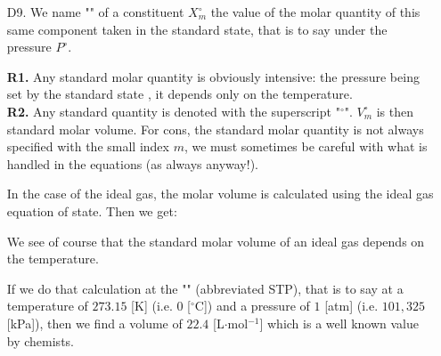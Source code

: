 \begin{enumerate}
		
		\item[D9.] We name "" of a constituent $X_m^\circ$ the value of the molar quantity of this same component taken in the standard state, that is to say under the pressure $P^\circ$.
		\begin{tcolorbox}[title=Remarks,arc=10pt,breakable,drop lifted shadow,
  skin=enhanced,
  skin first is subskin of={enhancedfirst}{arc=10pt,no shadow},
  skin middle is subskin of={enhancedmiddle}{arc=10pt,no shadow},
  skin last is subskin of={enhancedlast}{drop lifted shadow}]
		\textbf{R1.} Any standard molar quantity is obviously intensive: the pressure being set by the standard state , it depends only on the temperature.\\
		
		\textbf{R2.} Any standard quantity is denoted with the superscript "${}^\circ$". $V_m^\circ$ is then standard molar volume. For cons, the standard molar quantity is not always specified with the small index $m$, we must sometimes be careful with what is handled in the equations (as always anyway!).
		\end{tcolorbox}	
		In the case of the ideal gas, the molar volume is calculated using the ideal gas equation of state. Then we get:
		
		We see of course that the standard molar volume of an ideal gas depends on the temperature.
		
		If we do that calculation at the "" (abbreviated STP), that is to say at a temperature of $273.15$ [K] (i.e. $0$ [$^\circ$C]) and a pressure of $1$ [atm] (i.e. $101,325$ [kPa]), then we find a volume of $22.4$ [L$\cdot$mol$^{-1}$] which is a well known value by chemists.
	\end{enumerate}
	
